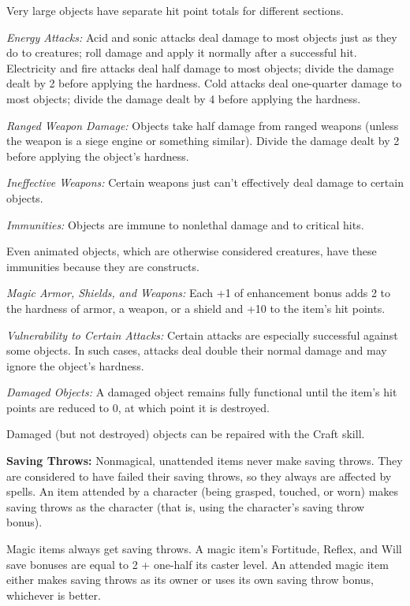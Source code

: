 Very large objects have separate hit point totals for different sections.

\textit{Energy Attacks:} Acid and sonic attacks deal damage to most objects just as they do to creatures; roll damage and apply it normally after a successful hit. Electricity and fire attacks deal half damage to most objects; divide the damage dealt by 2 before applying the hardness. Cold attacks deal one-quarter damage to most objects; divide the damage dealt by 4 before applying the hardness.

\textit{Ranged Weapon Damage:} Objects take half damage from ranged weapons (unless the weapon is a siege engine or something similar). Divide the damage dealt by 2 before applying the object's hardness.

\textit{Ineffective Weapons:} Certain weapons just can't effectively deal damage to certain objects.

\textit{Immunities:} Objects are immune to nonlethal damage and to critical hits.

Even animated objects, which are otherwise considered creatures, have these immunities because they are constructs.

\textit{Magic Armor, Shields, and Weapons:} Each +1 of enhancement bonus adds 2 to the hardness of armor, a weapon, or a shield and +10 to the item's hit points.

\textit{Vulnerability to Certain Attacks:} Certain attacks are especially successful against some objects. In such cases, attacks deal double their normal damage and may ignore the object's hardness.

\textit{Damaged Objects:} A damaged object remains fully functional until the item's hit points are reduced to 0, at which point it is destroyed.

Damaged (but not destroyed) objects can be repaired with the Craft skill.

\textbf{Saving Throws:} Nonmagical, unattended items never make saving throws. They are considered to have failed their saving throws, so they always are affected by spells. An item attended by a character (being grasped, touched, or worn) makes saving throws as the character (that is, using the character's saving throw bonus).

Magic items always get saving throws. A magic item's Fortitude, Reflex, and Will save bonuses are equal to 2 + one-half its caster level. An attended magic item either makes saving throws as its owner or uses its own saving throw bonus, whichever is better.

